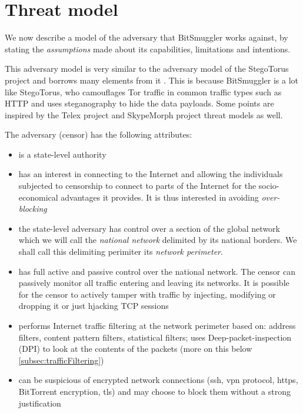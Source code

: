 \documentclass[11pt]{article} %
\newcommand{\projectName}{BitSmuggler }
\begin{document}
\section{Threat model}
\label{sec:threatModel}

We now describe a model of the adversary that \projectName works against, by stating the \textit{assumptions} made about its capabilities, limitations and intentions.

This adversary model is very similar to the adversary model of the StegoTorus project  \citep*{stegotorus} and borrows many elements from it . This is because \projectName  is a lot like StegoTorus, who camouflages Tor traffic in common traffic types such as HTTP and uses steganography to hide the data payloads. Some points are inspired by the Telex project \citep*{telex11} and SkypeMorph project\citep*{skypeMorph} threat models as well.

The adversary (censor) has the following attributes:

\begin{itemize}
\item is a state-level authority
\item has an interest in connecting to the Internet and allowing the individuals subjected to censorship to connect to parts of the Internet for the socio-economical advantages it provides. It is thus interested in avoiding \textit{over-blocking}
\item the state-level adversary has control over a section of the global network which we will call the \textit{national network} delimited by its national borders. We shall call this delimiting perimiter its \textit{network perimeter}.
\item has full active and passive control over the national network. The censor can passively monitor all traffic entering and leaving its networks. It is possible for the censor to actively tamper with traffic by injecting, modifying or dropping it or just hjacking TCP sessions
\item performs Internet traffic filtering at the network perimeter based on: address filters, content pattern filters, statistical filters; uses Deep-packet-inspection (DPI) to look at the contents of the packets (more on this below \ref{subsec:trafficFiltering})

\item can be suspicious of encrypted network connections (ssh, vpn protocol, https, BitTorrent encryption, tls) and may choose to block them without a strong justification

\end{itemize}
\end{document}
